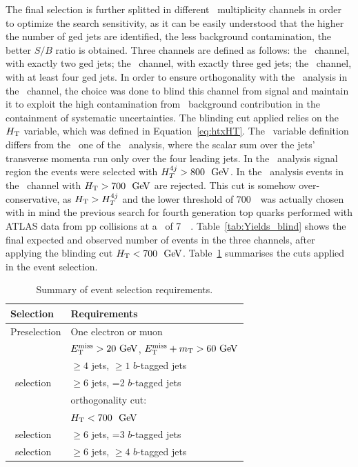 The final selection is further splitted in different \bjet\ multiplicity 
channels in order to optimize the search sensitivity, as it can be
easily understood that the higher the number of \btag ged jets are
identified, the less background contamination, 
the better $S/B$ ratio is obtained. Three channels are
defined as follows: the \chii\ channel, with exactly two \btag ged jets;
the \chiii\ channel, with exactly three \btag ged jets;
the \chiv\ channel, with at least four \btag ged jets.
In order to ensure orthogonality with the \wbx\ analysis
in the \chii\ channel, the choice was done to blind this channel
from signal and maintain it to exploit the high contamination from
\ttbar\ background contribution in the containment of systematic
uncertainties. The blinding cut applied relies on the $\HT$ variable,
which was defined in Equation~\ref{eq:htxHT}.
The \HT\ variable definition differs from the \htfj\ one of the \wbx\ analysis,
where the scalar sum over the jets' transverse momenta run only
over the four leading jets. In the \wbx\ analysis signal region the 
events were selected with $\htfj > 800~\gev$. In the \htx\ 
analysis events in the \chii\ channel with $\HT > 700~\gev$
are rejected. This cut is somehow over-conservative, as $\HT>\htfj$
and the lower threshold of 700~\gev\ was actually chosen with in mind
the previous search for fourth generation top quarks performed with
ATLAS data from pp collisions at a \cme\ of 7~\tev~\cite{ATLAS:2012qe}.
Table~\ref{tab:Yields_blind} shows the final expected and
observed number of events in the three channels, after applying 
the blinding cut $\HT < 700~\gev$.
Table~\ref{tab:htxselection} summarises the cuts applied in the event selection.


\begin{table}[tb]
\begin{center}
\begin{tabular}{ll}
\toprule
Selection & Requirements \\
\midrule
Preselection & One electron or muon  \\
             & $\met >20\gev$, $\met +m_{\rm T}>60\gev$ \\
             & $\geq 4$ jets, $\geq 1$ $b$-tagged jets \\
\midrule
\chii\ selection & $\geq 6$ jets, =2 $b$-tagged jets \\
 & orthogonality cut: \\
 & $\HT < 700~\gev$ \\
\midrule
\chiii\ selection & $\geq 6$ jets,  =3 $b$-tagged jets \\
\midrule
\chiv\ selection &$\geq 6$ jets,  $\geq 4$ $b$-tagged jets \\
\bottomrule
\end{tabular}
\caption{Summary of event selection requirements.}
\label{tab:htxselection}
\end{center}
\end{table}




